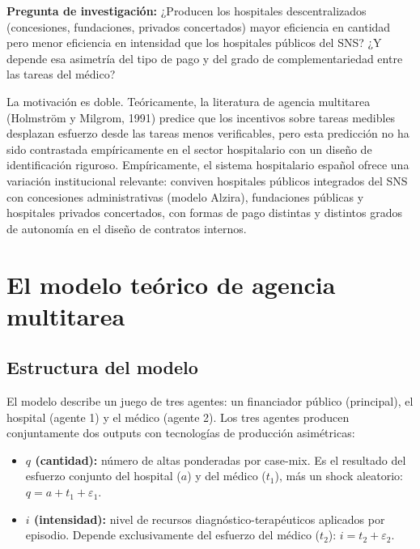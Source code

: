 \documentclass[12pt, a4paper]{article}
\begin{document}
\begin{cajadestacada}
\textbf{Pregunta de investigación:} ¿Producen los hospitales descentralizados
(concesiones, fundaciones, privados concertados) mayor eficiencia en cantidad
pero menor eficiencia en intensidad que los hospitales públicos del SNS? ¿Y
depende esa asimetría del tipo de pago y del grado de complementariedad entre
las tareas del médico?
\end{cajadestacada}

La motivación es doble. Teóricamente, la literatura de agencia multitarea
(Holmström y Milgrom, 1991) predice que los incentivos sobre tareas medibles
desplazan esfuerzo desde las tareas menos verificables, pero esta predicción no
ha sido contrastada empíricamente en el sector hospitalario con un diseño de
identificación riguroso. Empíricamente, el sistema hospitalario español ofrece
una variación institucional relevante: conviven hospitales públicos integrados
del SNS con concesiones administrativas (modelo Alzira), fundaciones públicas y
hospitales privados concertados, con formas de pago distintas y distintos
grados de autonomía en el diseño de contratos internos.

\section{El modelo teórico de agencia multitarea}

\subsection{Estructura del modelo}

El modelo describe un juego de tres agentes: un financiador público
(principal), el hospital (agente 1) y el médico (agente 2). Los tres agentes
producen conjuntamente dos outputs con tecnologías de producción asimétricas:

\begin{itemize}
  \item \textbf{$q$ (cantidad):} número de altas ponderadas por case-mix. Es el
    resultado del esfuerzo conjunto del hospital ($a$) y del médico ($t_1$),
    más un shock aleatorio: $q = a + t_1 + \varepsilon_1$.
  \item \textbf{$i$ (intensidad):} nivel de recursos diagnóstico-terapéuticos
    aplicados por episodio. Depende exclusivamente del esfuerzo del médico
    ($t_2$): $i = t_2 + \varepsilon_2$.
\end{itemize}
\end{document}
